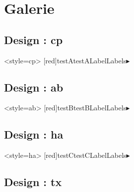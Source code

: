\documentclass[french,11pt,a4paper]{article}
\begin{document}
\pagebreak

\section{Galerie}


\subsection{Design : cp}

\begin{demohigh}[language=latex/latex2,style/main=cyan!10,style/code=cyan!10]
\GenereBoite<style=cp>%
  [red]{testA}{testA}{Label}{Labels}{$\blacktriangleright$\,}

\begin{testA}
\lipsum[1][1-5]
\end{testA}
\end{demohigh}

\subsection{Design : ab}

\begin{demohigh}[language=latex/latex2,style/main=cyan!10,style/code=cyan!10]
\GenereBoite<style=ab>%
  [red]{testB}{testB}{Label}{Labels}{$\blacktriangleright$\,}

\begin{testB}
\lipsum[1][1-5]
\end{testB}
\end{demohigh}

\subsection{Design : ha}

\begin{demohigh}[language=latex/latex2,style/main=cyan!10,style/code=cyan!10]
\GenereBoite<style=ha>%
  [red]{testC}{testC}{Label}{Labels}{$\blacktriangleright$\,}

\begin{testC}
\lipsum[1][1-5]
\end{testC}
\end{demohigh}

\subsection{Design : tx}
\end{document}
